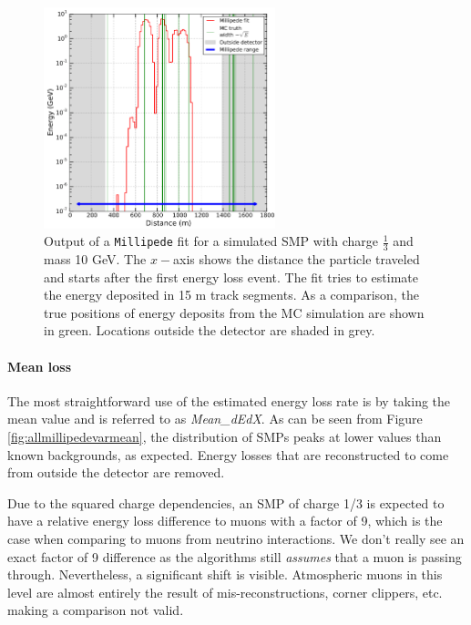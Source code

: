 \begin{figure}
\centering
\includegraphics[width=0.6\textwidth]{chapter8/img/millipedeStef.png}
\caption{Output of a \texttt{Millipede} fit for a simulated SMP with charge $\frac{1}{3}$ and mass 10 GeV. The $x-$axis shows the distance the particle traveled and starts after the first energy loss event. The fit tries to estimate the energy deposited in 15 m track segments. As a comparison, the true positions of energy deposits from the MC simulation are shown in green. Locations outside the detector are shaded in grey.}
\label{fig:millipedeoutput}
\end{figure}

\paragraph{Mean loss}
The most straightforward use of the estimated energy loss rate is by taking the mean value and is referred to as \textit{Mean\_dEdX}. As can be seen from Figure \ref{fig:allmillipedevarmean}, the distribution of SMPs peaks at lower values than known backgrounds, as expected. Energy losses that are reconstructed to come from outside the detector are removed. 

Due to the squared charge dependencies, an SMP of charge 1/3 is expected to have a relative energy loss difference to muons with a factor of 9, which is the case when comparing to muons from neutrino interactions. We don't really see an exact factor of 9 difference as the algorithms still \textit{assumes} that a muon is passing through. Nevertheless, a significant shift is visible. Atmospheric muons in this level are almost entirely the result of mis-reconstructions, corner clippers, etc. making a comparison not valid.

